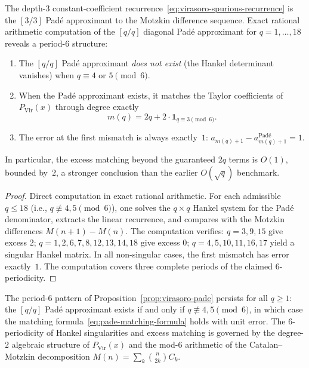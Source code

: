 \begin{proposition}
\label{prop:virasoro-pade}
The depth-$3$ constant-coefficient
recurrence~\eqref{eq:virasoro-spurious-recurrence} is the $[3/3]$
Pad\'e approximant to the Motzkin difference sequence. Exact rational
arithmetic computation of the $[q/q]$ diagonal Pad\'e approximant for
$q = 1, \ldots, 18$ reveals a period-$6$ structure:
\begin{enumerate}[label=\textup{(\roman*)}]
\item The $[q/q]$ Pad\'e approximant \emph{does not exist}
 \textup{(}the Hankel determinant vanishes\textup{)} when
 $q \equiv 4$ or $5 \pmod{6}$.
\item When the Pad\'e approximant exists, it matches the Taylor
 coefficients of $P_{\mathrm{Vir}}(x)$ through degree exactly
 \begin{equation}\label{eq:pade-matching-formula}
 m(q) = 2q + 2 \cdot \mathbf{1}_{q \equiv 3 \pmod{6}}.
 \end{equation}
\item The error at the first mismatch is always exactly~$1$:
 $a_{m(q)+1} - a_{m(q)+1}^{\text{Pad\'e}} = 1$.
\end{enumerate}
In particular, the excess matching beyond the guaranteed $2q$ terms is
$O(1)$, bounded by~$2$, a stronger conclusion than the earlier
$O(\sqrt{q})$ benchmark.
\end{proposition}

\begin{proof}
Direct computation in exact rational arithmetic. For each admissible
$q \leq 18$ (i.e., $q \not\equiv 4, 5 \pmod{6}$), one solves the
$q \times q$ Hankel system for the Pad\'e denominator, extracts the
linear recurrence, and compares with the Motzkin differences $M(n+1) -
M(n)$. The computation verifies: $q = 3, 9, 15$ give excess $2$; $q
= 1, 2, 6, 7, 8, 12, 13, 14, 18$ give excess $0$; $q = 4, 5, 10,
11, 16, 17$ yield a singular Hankel matrix. In all non-singular
cases, the first mismatch has error exactly~$1$. The computation
covers three complete periods of the claimed $6$-periodicity.
\end{proof}

\begin{conjecture}
\label{conj:virasoro-pade-periodic}
The period-$6$ pattern of
Proposition~\textup{\ref{prop:virasoro-pade}} persists for all
$q \geq 1$: the $[q/q]$ Pad\'e approximant exists if and only if
$q \not\equiv 4, 5 \pmod{6}$, in which case the matching
formula~\eqref{eq:pade-matching-formula} holds with unit error. The
$6$-periodicity of Hankel singularities and excess matching is
governed by the degree-$2$ algebraic structure of $P_{\mathrm{Vir}}(x)$
and the mod-$6$ arithmetic of the Catalan--Motzkin decomposition
$M(n) = \sum_{k} \binom{n}{2k} C_k$.
\end{conjecture}

